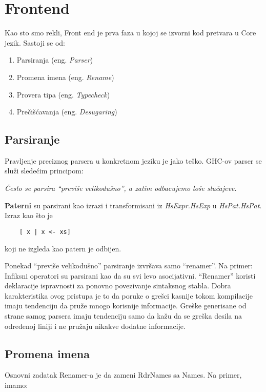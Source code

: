 \section{Frontend}
\label{sec:frontend}

Kao sto smo rekli, Front end je prva faza u kojoj se izvorni kod pretvara u Core jezik. Sastoji se od:
	 \begin{enumerate}
	 	\item Parsiranja (eng. \emph{Parser})
	 	\item Promena imena (eng. \emph{Rename}) 
	 	\item Provera tipa (eng. \emph{Typecheck})
	 	\item Prečišćavanja (eng. \emph{Desugaring})
	 \end{enumerate}


\subsection{Parsiranje}
\label{subsec:podnaslovParse}

Pravljenje preciznog parsera u konkretnom jeziku je jako teško. GHC-ov parser se služi sledećim principom: 

\textit{Često se parsira “previše velikodušno”,  a zatim odbacujemo loše slučajeve.}

\textbf{Paterni} su parsirani kao izrazi i transformisani iz 
\textit{HsExpr.HsExp} u\textit{ HsPat.HsPat}. Izraz kao što je
\begin{verbatim}
	[ x | x <- xs]
\end{verbatim}  
koji ne izgleda kao patern je odbijen.

Ponekad “previše velikodušno” parsiranje izvršava samo “renamer”. Na primer:
Infiksni operatori  su parsirani kao da su svi levo asocijativni. “Renamer” koristi deklaracije ispravnosti za ponovno povezivanje sintaksnog stabla. Dobra karakteristika ovog pristupa je to da poruke o grešci kasnije  tokom kompilacije imaju tendenciju da pruže mnogo korisnije informacije. Greške generisane od strane samog parsera imaju tendenciju samo da kažu da se greška desila na određenoj liniji i ne pružaju nikakve dodatne informacije.

\subsection{Promena imena}
\label{subsec:podnaslovRename}

Osnovni zadatak Renamer-a je da zameni RdrNames sa Names. Na primer, imamo:

